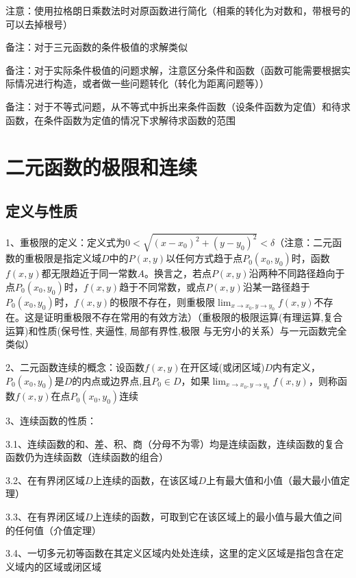 注意：使用拉格朗日乘数法时对原函数进行简化（相乘的转化为对数和，带根号的可以去掉根号）

备注：对于三元函数的条件极值的求解类似

备注：对于实际条件极值的问题求解，注意区分条件和函数（函数可能需要根据实际情况进行构造，或者做一些问题转化（转化为距离问题等））

备注：对于不等式问题，从不等式中拆出来条件函数（设条件函数为定值）和待求函数，在条件函数为定值的情况下求解待求函数的范围



\section{二元函数的极限和连续}



\subsection{定义与性质}

1、重极限的定义：定义式为$0<\sqrt{\left(x-x_{0}\right)^{2}+\left(y-y_{0}\right)^{2}}<\delta$（注意：二元函数的重极限是指定义域$D$中的$P(x, y)$以任何方式趋于点$P_{0}\left(x_{0}, y_{0}\right)$时，函数$f(x, y)$都无限趋近于同一常数$A$。换言之，若点$P(x, y)$沿两种不同路径趋向于点$P_{0}\left(x_{0}, y_{0}\right)$时，$f(x, y)$趋于不同常数，或点$P(x, y)$沿某一路径趋于$P_{0}\left(x_{0}, y_{0}\right)$时，$f(x, y)$的极限不存在，则重极限$\lim_{x \rightarrow x_{0},y \rightarrow y_{0}} f(x, y)$不存在。这是证明重极限不存在常用的有效方法）（重极限的极限运算(有理运算,复合运算)和性质(保号性, 夹逼性, 局部有界性,极限 与无穷小的关系）与一元函数完全类似）

2、二元函数连续的概念：设函数$f(x, y)$在开区域(或闭区域)$D$内有定义，$P_{0}\left(x_{0}, y_{0}\right)$是$D$的内点或边界点,且$P_{0} \in D$，如果$\lim_{x \rightarrow x_{0},y \rightarrow y_{0}} f(x, y)$，则称函数$f(x, y)$在点$P_{0}\left(x_{0}, y_{0}\right)$连续

3、连续函数的性质：

3.1、连续函数的和、差、积、商（分母不为零）均是连续函数，连续函数的复合函数仍为连续函数（连续函数的组合）

3.2、在有界闭区域$D$上连续的函数，在该区域$D$上有最大值和小值（最大最小值定理）

3.3、在有界闭区域$D$上连续的函数，可取到它在该区域上的最小值与最大值之间的任何值（介值定理）

3.4、一切多元初等函数在其定义区域内处处连续，这里的定义区域是指包含在定义域内的区域或闭区域

